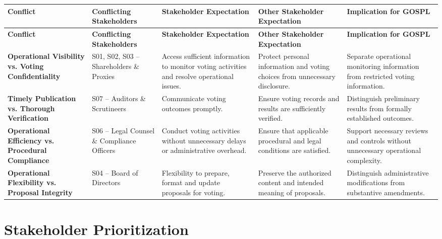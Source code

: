 \documentclass[11pt,a4paper]{article}
\begin{document}
\begingroup\small
\begin{longtable}{@{}>{\raggedright\arraybackslash}p{}>{\raggedright\arraybackslash}p{}>{\raggedright\arraybackslash}p{}>{\raggedright\arraybackslash}p{}>{\raggedright\arraybackslash}p{}@{}}
\toprule
\textbf{Conflict} & \textbf{Conflicting Stakeholders} & \textbf{Stakeholder Expectation} & \textbf{Other Stakeholder Expectation} & \textbf{Implication for GOSPL} \\
\midrule
\endfirsthead
\toprule
\textbf{Conflict} & \textbf{Conflicting Stakeholders} & \textbf{Stakeholder Expectation} & \textbf{Other Stakeholder Expectation} & \textbf{Implication for GOSPL} \\
\midrule
\endhead
\bottomrule
\endfoot
\textbf{Operational Visibility vs. Voting Confidentiality} & S01, S02, S03 -- Shareholders \& Proxies & Access sufficient information to monitor voting activities and resolve operational issues. & Protect personal information and voting choices from unnecessary disclosure. & Separate operational monitoring information from restricted voting information. \\
\addlinespace
\textbf{Timely Publication vs. Thorough Verification} & S07 -- Auditors \& Scrutineers & Communicate voting outcomes promptly. & Ensure voting records and results are sufficiently verified. & Distinguish preliminary results from formally established outcomes. \\
\addlinespace
\textbf{Operational Efficiency vs. Procedural Compliance} & S06 -- Legal Counsel \& Compliance Officers & Conduct voting activities without unnecessary delays or administrative overhead. & Ensure that applicable procedural and legal conditions are satisfied. & Support necessary reviews and controls without unnecessary operational complexity. \\
\addlinespace
\textbf{Operational Flexibility vs. Proposal Integrity} & S04 -- Board of Directors & Flexibility to prepare, format and update proposals for voting. & Preserve the authorized content and intended meaning of proposals. & Distinguish administrative modifications from substantive amendments. \\
\end{longtable}
\endgroup


\section*{Stakeholder Prioritization}
\end{document}
